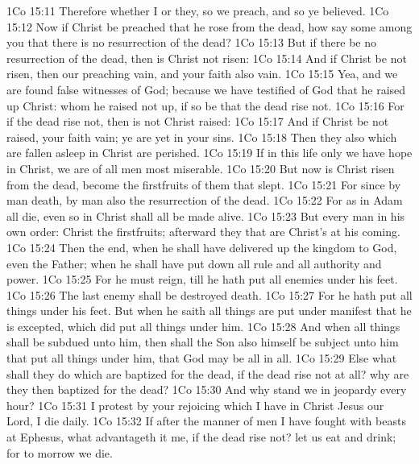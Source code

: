 \vs 1Co 15:11 Therefore whether  I or they, so we preach, and so ye believed.
\vs 1Co 15:12 Now if Christ be preached that he rose from the dead, how say some among you that there is no resurrection of the dead?
\vs 1Co 15:13 But if there be no resurrection of the dead, then is Christ not risen:
\vs 1Co 15:14 And if Christ be not risen, then  our preaching vain, and your faith  also vain.
\vs 1Co 15:15 Yea, and we are found false witnesses of God; because we have testified of God that he raised up Christ: whom he raised not up, if so be that the dead rise not.
\vs 1Co 15:16 For if the dead rise not, then is not Christ raised:
\vs 1Co 15:17 And if Christ be not raised, your faith  vain; ye are yet in your sins.
\vs 1Co 15:18 Then they also which are fallen asleep in Christ are perished.
\vs 1Co 15:19 If in this life only we have hope in Christ, we are of all men most miserable.
\vs 1Co 15:20 But now is Christ risen from the dead,  become the firstfruits of them that slept.
\vs 1Co 15:21 For since by man  death, by man  also the resurrection of the dead.
\vs 1Co 15:22 For as in Adam all die, even so in Christ shall all be made alive.
\vs 1Co 15:23 But every man in his own order: Christ the firstfruits; afterward they that are Christ's at his coming.
\vs 1Co 15:24 Then  the end, when he shall have delivered up the kingdom to God, even the Father; when he shall have put down all rule and all authority and power.
\vs 1Co 15:25 For he must reign, till he hath put all enemies under his feet.
\vs 1Co 15:26 The last enemy  shall be destroyed  death.
\vs 1Co 15:27 For he hath put all things under his feet. But when he saith all things are put under  manifest that he is excepted, which did put all things under him.
\vs 1Co 15:28 And when all things shall be subdued unto him, then shall the Son also himself be subject unto him that put all things under him, that God may be all in all.
\vs 1Co 15:29 Else what shall they do which are baptized for the dead, if the dead rise not at all? why are they then baptized for the dead?
\vs 1Co 15:30 And why stand we in jeopardy every hour?
\vs 1Co 15:31 I protest by your rejoicing which I have in Christ Jesus our Lord, I die daily.
\vs 1Co 15:32 If after the manner of men I have fought with beasts at Ephesus, what advantageth it me, if the dead rise not? let us eat and drink; for to morrow we die.

